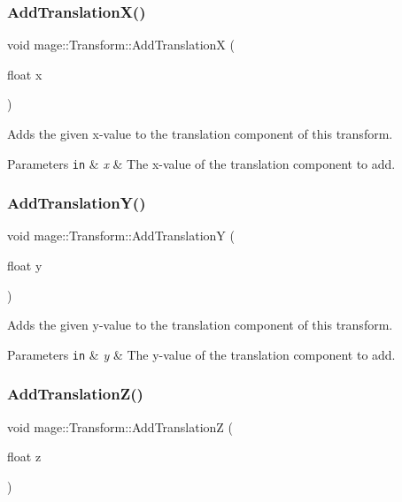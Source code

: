 \subsubsection{\texorpdfstring{Add\+Translation\+X()}{AddTranslationX()}}
{\footnotesize\ttfamily void mage\+::\+Transform\+::\+Add\+TranslationX (\begin{DoxyParamCaption}\item[{float}]{x }\end{DoxyParamCaption})}

Adds the given x-\/value to the translation component of this transform.


\begin{DoxyParams}[1]{Parameters}
\mbox{\tt in}  & {\em x} & The x-\/value of the translation component to add. \\
\hline
\end{DoxyParams}
\hypertarget{structmage_1_1_transform_aef8f3728f6d6d55e69689cff2af4c26f}{}\label{structmage_1_1_transform_aef8f3728f6d6d55e69689cff2af4c26f} 
\subsubsection{\texorpdfstring{Add\+Translation\+Y()}{AddTranslationY()}}
{\footnotesize\ttfamily void mage\+::\+Transform\+::\+Add\+TranslationY (\begin{DoxyParamCaption}\item[{float}]{y }\end{DoxyParamCaption})}

Adds the given y-\/value to the translation component of this transform.


\begin{DoxyParams}[1]{Parameters}
\mbox{\tt in}  & {\em y} & The y-\/value of the translation component to add. \\
\hline
\end{DoxyParams}
\hypertarget{structmage_1_1_transform_a0553f72a6fcf38128d2201d54584f079}{}\label{structmage_1_1_transform_a0553f72a6fcf38128d2201d54584f079} 
\subsubsection{\texorpdfstring{Add\+Translation\+Z()}{AddTranslationZ()}}
{\footnotesize\ttfamily void mage\+::\+Transform\+::\+Add\+TranslationZ (\begin{DoxyParamCaption}\item[{float}]{z }\end{DoxyParamCaption})}

